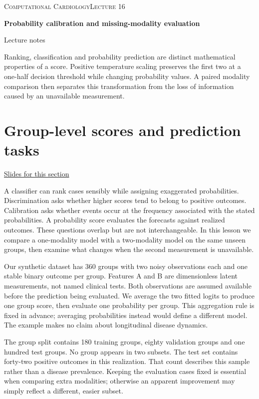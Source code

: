 \documentclass[11pt,letterpaper]{article}
\theoremstyle{definition}\newtheorem{definition}{Definition}\newtheorem{example}{Example}
\numberwithin{equation}{section}
\begin{document}
{\small\scshape Computational Cardiology\hfill Lecture 16}\par\medskip
{\raggedright{}\LARGE\bfseries\color{ink} Probability calibration and missing-modality evaluation\par}\medskip
{\small Lecture notes}\par\bigskip
Ranking, classification and probability prediction are distinct mathematical properties of a score. Positive temperature scaling preserves the first two at a one-half decision threshold while changing probability values. A paired modality comparison then separates this transformation from the loss of information caused by an unavailable measurement.

\section{Group-level scores and prediction tasks}
\hypertarget{note-group-level-scores-and-prediction-tasks}{}\label{note:group-level-scores-and-prediction-tasks}
{\small \href{slides.html\#frame=three-properties-of-a-score\&step=1}{Slides for this section}}\par
A classifier can rank cases sensibly while assigning exaggerated probabilities. Discrimination asks whether higher scores tend to belong to positive outcomes. Calibration asks whether events occur at the frequency associated with the stated probabilities. A probability score evaluates the forecasts against realized outcomes. These questions overlap but are not interchangeable. In this lesson we compare a one-modality model with a two-modality model on the same unseen groups, then examine what changes when the second measurement is unavailable.

Our synthetic dataset has 360 groups with two noisy observations each and one stable binary outcome per group. Features A and B are dimensionless latent measurements, not named clinical tests. Both observations are assumed available before the prediction being evaluated. We average the two fitted logits to produce one group score, then evaluate one probability per group. This aggregation rule is fixed in advance; averaging probabilities instead would define a different model. The example makes no claim about longitudinal disease dynamics.

The group split contains 180 training groups, eighty validation groups and one hundred test groups. No group appears in two subsets. The test set contains forty-two positive outcomes in this realization. That count describes this sample rather than a disease prevalence. Keeping the evaluation cases fixed is essential when comparing extra modalities; otherwise an apparent improvement may simply reflect a different, easier subset.
\end{document}
